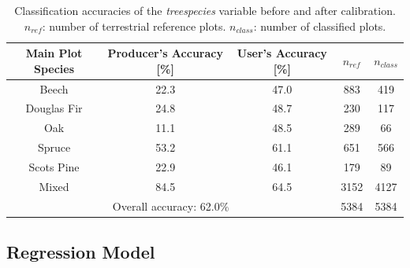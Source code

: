 \documentclass[remotesensing,article,accept,moreauthors,pdftex,10pt,a4paper]{Definitions/mdpi}
\begin{document}
\begin{table}[H]
	\begin{center}
		\caption{Classification accuracies of the \textit{treespecies} variable before and after calibration. $n_{ref}$: number of terrestrial reference plots. $n_{class}$: number of classified plots.}
		
		\label{tab:classacc}
		{\small %
			\begin{tabular}{ccccc} %
				\toprule
				\textbf{Main Plot Species} & \textbf{Producer's Accuracy} \textbf{[\%] }& \textbf{User's Accuracy} \textbf{[\%]} & \boldmath$n_{ref}$ &\boldmath $n_{class}$ \\
				\midrule
				Beech       & 22.3 & 47.0 & 883 & 419 \\
				Douglas Fir & 24.8 & 48.7 & 230 & 117 \\
				Oak         & 11.1 & 48.5 & 289 & 66 \\
				Spruce      & 53.2 & 61.1 & 651 & 566 \\
				Scots Pine  & 22.9 & 46.1 & 179 & 89 \\
				Mixed       & 84.5 & 64.5 & 3152 & 4127 \\
				\midrule
				\multicolumn{3}{c}{Overall accuracy: 62.0\%} & 5384 & 5384 \\
				\bottomrule
			\end{tabular}
		}%
	\end{center}
\end{table}
\vspace{-15pt}

\subsection{Regression Model}
\label{sec:regmod}
\end{document}
